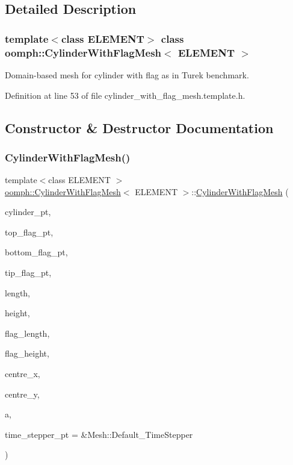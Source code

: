 \subsection{Detailed Description}
\subsubsection*{template$<$class E\+L\+E\+M\+E\+NT$>$\newline
class oomph\+::\+Cylinder\+With\+Flag\+Mesh$<$ E\+L\+E\+M\+E\+N\+T $>$}

Domain-\/based mesh for cylinder with flag as in Turek benchmark. 

Definition at line 53 of file cylinder\+\_\+with\+\_\+flag\+\_\+mesh.\+template.\+h.



\subsection{Constructor \& Destructor Documentation}
\mbox{\label{classoomph_1_1CylinderWithFlagMesh_a6591a2b9fdcb8080c899e34b9c8277cd}} 
\subsubsection{\texorpdfstring{Cylinder\+With\+Flag\+Mesh()}{CylinderWithFlagMesh()}}
{\footnotesize\ttfamily template$<$class E\+L\+E\+M\+E\+NT $>$ \\
\hyperlink{classoomph_1_1CylinderWithFlagMesh}{oomph\+::\+Cylinder\+With\+Flag\+Mesh}$<$ E\+L\+E\+M\+E\+NT $>$\+::\hyperlink{classoomph_1_1CylinderWithFlagMesh}{Cylinder\+With\+Flag\+Mesh} (\begin{DoxyParamCaption}\item[{Circle $\ast$}]{cylinder\+\_\+pt,  }\item[{Geom\+Object $\ast$}]{top\+\_\+flag\+\_\+pt,  }\item[{Geom\+Object $\ast$}]{bottom\+\_\+flag\+\_\+pt,  }\item[{Geom\+Object $\ast$}]{tip\+\_\+flag\+\_\+pt,  }\item[{const double \&}]{length,  }\item[{const double \&}]{height,  }\item[{const double \&}]{flag\+\_\+length,  }\item[{const double \&}]{flag\+\_\+height,  }\item[{const double \&}]{centre\+\_\+x,  }\item[{const double \&}]{centre\+\_\+y,  }\item[{const double \&}]{a,  }\item[{Time\+Stepper $\ast$}]{time\+\_\+stepper\+\_\+pt = {\ttfamily \&Mesh\+:\+:Default\+\_\+TimeStepper} }\end{DoxyParamCaption})}



